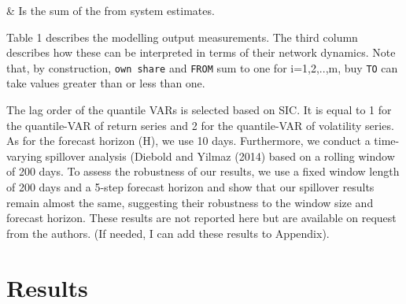 \documentclass[
  letterpaper,
  DIV=11,
  numbers=noendperiod]{scrartcl}
\begin{document}
\begin{longtable}[]
                                                                                                                                                                                                                                                                                                                                                                                                                                                                                                                                                                                                                                                                                                                                                                                                                                                                                                                                                                                                                                                                                                              \)
& Is the sum of the from system estimates. \\
\end{longtable}

Table 1 describes the modelling output measurements. The third column
describes how these can be interpreted in terms of their network
dynamics. Note that, by construction, \texttt{own\ share} and
\texttt{FROM} sum to one for i=1,2,..,m, buy \texttt{TO} can take values
greater than or less than one.

The lag order of the quantile VARs is selected based on SIC. It is equal
to 1 for the quantile-VAR of return series and 2 for the quantile-VAR of
volatility series. As for the forecast horizon (H), we use 10 days.
Furthermore, we conduct a time-varying spillover analysis (Diebold and
Yilmaz (2014) based on a rolling window of 200 days. To assess the
robustness of our results, we use a fixed window length of 200 days and
a 5-step forecast horizon and show that our spillover results remain
almost the same, suggesting their robustness to the window size and
forecast horizon. These results are not reported here but are available
on request from the authors. (If needed, I can add these results to
Appendix).

\hypertarget{results}{%
\section{Results}\label{results}}
\end{document}

